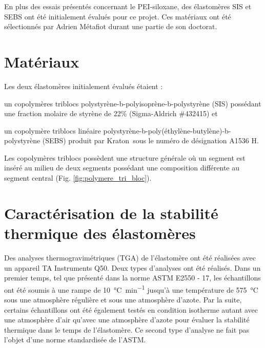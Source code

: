 \label{sec:Annexe_A}

En plus des essais présentés concernant le PEI-siloxane, des élastomères SIS et SEBS ont été initialement évalués pour ce projet. 
Ces matériaux ont été sélectionnés par Adrien Métafiot durant une partie de son doctorat. 

\section{Matériaux}

Les deux élastomères initialement évalués étaient : 
\begin{inparaenum}[]
	\item un copolymères triblocs polystyrène-b-polyisoprène-b-polystyrène (SIS) possédant une fraction molaire de styrène de 22\% (Sigma-Aldrich \#432415) et 
	\item un copolymère triblocs linéaire polystyrène-b-poly(éthylène-butylène)-b-polystyrène (SEBS) produit par Kraton\textregistered \ sous le numéro de désignation A1536 H. 
\end{inparaenum}
Les copolymères triblocs possèdent une structure générale où un segment est inséré au milieu de deux segments possédant une composition différente au segment central (Fig. \ref{fig:polymere_tri_bloc}). 

\section{Caractérisation de la stabilité thermique des élastomères}

Des analyses thermogravimétriques (TGA) de l'élastomère ont été réalisées avec un appareil TA Instruments Q50. 
Deux types d'analyses ont été réalisés. 
Dans un premier temps, tel que présenté dans la norme ASTM E2550 - 17, les échantillons ont été soumis à une rampe de \SI[locale=FR]{10}{\celsius\per\minute} jusqu'à une température de \SI[locale=FR]{575}{\celsius} sous une atmosphère régulière et sous une atmosphère d'azote. 
Par la suite, certains échantillons ont été également testés en condition isotherme autant avec une atmosphère d'air qu'avec une atmosphère d'azote pour évaluer la stabilité thermique dans le temps de l'élastomère. 
Ce second type d'analyse ne fait pas l'objet d'une norme standardisée de l'ASTM. 

